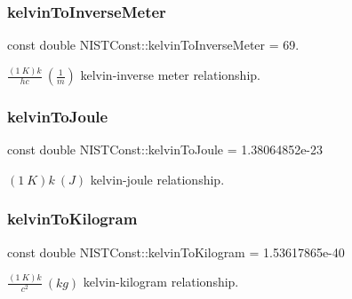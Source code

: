\subsubsection{\texorpdfstring{kelvin\+To\+Inverse\+Meter}{kelvinToInverseMeter}}
{\footnotesize\ttfamily const double N\+I\+S\+T\+Const\+::kelvin\+To\+Inverse\+Meter = 69.}

$\frac{(1\ K)k}{hc} \ (\frac{1}{m})$ kelvin-\/inverse meter relationship. \mbox{\label{group___kelvin_gae77577280e3dd4a78d41af37076c8f8d}} 
\subsubsection{\texorpdfstring{kelvin\+To\+Joule}{kelvinToJoule}}
{\footnotesize\ttfamily const double N\+I\+S\+T\+Const\+::kelvin\+To\+Joule = 1.\+38064852e-\/23}

$(1\ K)k \ (J)$ kelvin-\/joule relationship. \mbox{\label{group___kelvin_gaf5fcf341c9c92f8ede2f402989ae8de1}} 
\subsubsection{\texorpdfstring{kelvin\+To\+Kilogram}{kelvinToKilogram}}
{\footnotesize\ttfamily const double N\+I\+S\+T\+Const\+::kelvin\+To\+Kilogram = 1.\+53617865e-\/40}

$\frac{(1\ K)k}{c^2} \ (kg)$ kelvin-\/kilogram relationship. 